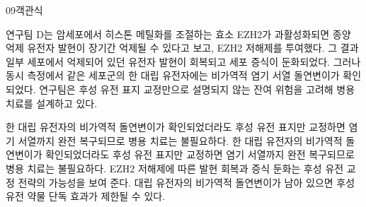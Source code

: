\documentclass[fs85,seriesWit]{korfarm-base}
\begin{document}
\begin{kfQBlock}{09}{객관식}
\begin{kfEvidence}연구팀 D는 암세포에서 히스톤 메틸화를 조절하는 효소 EZH2가 과활성화되면 종양 억제 유전자 발현이 장기간 억제될 수 있다고 보고, EZH2 저해제를 투여했다. 그 결과 일부 세포에서 억제되어 있던 유전자 발현이 회복되고 세포 증식이 둔화되었다. 그러나 동시 측정에서 같은 세포군의 한 대립 유전자에는 비가역적 염기 서열 돌연변이가 확인되었다. 연구팀은 후성 유전 표지 교정만으로 설명되지 않는 잔여 위험을 고려해 병용 치료를 설계하고 있다.\end{kfEvidence}
\begin{kfChoices}
\kfChoice 한 대립 유전자의 비가역적 돌연변이가 확인되었더라도 후성 유전 표지만 교정하면 염기 서열까지 완전 복구되므로 병용 치료는 불필요하다.
\kfChoice 한 대립 유전자의 비가역적 돌연변이가 확인되었더라도 후성 유전 표지만 교정하면 염기 서열까지 완전 복구되므로 병용 치료는 불필요하다.
\kfChoice EZH2 저해제에 따른 발현 회복과 증식 둔화는 후성 유전 교정 전략의 가능성을 보여 준다.
\kfChoice 대립 유전자의 비가역적 돌연변이가 남아 있으면 후성 유전 약물 단독 효과가 제한될 수 있다.
\end{kfChoices}
\end{kfQBlock}
\end{document}

